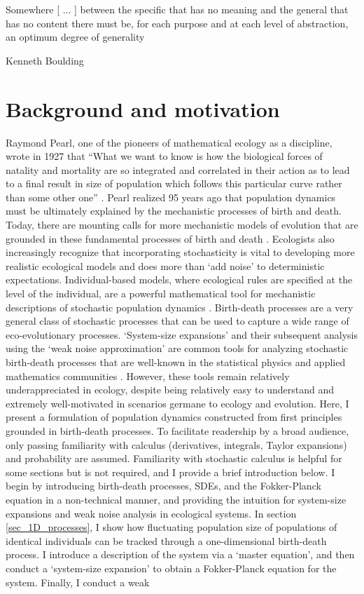 \epigraph{\justifying Somewhere [ ... ] between the specific that has no meaning and the general that has no content there must be, for each purpose and at each level of abstraction, an optimum degree of generality}{Kenneth Boulding}

\section{Background and motivation}

Raymond Pearl, one of the pioneers of mathematical ecology as a discipline, wrote in 1927 that ``What we want to know is how the biological forces of natality and mortality are so integrated and correlated in their action as to lead to a final result in size of population which follows this particular curve rather than some other one'' \citep{pearl_growth_1976}. Pearl realized 95 years ago that population dynamics must be ultimately explained by the mechanistic processes of birth and death. Today, there are mounting calls for more mechanistic models of evolution that are grounded in these fundamental processes of birth and death \citep{geritz_mathematical_2012,doebeli_towards_2017}. Ecologists also increasingly recognize that incorporating stochasticity is vital to developing more realistic ecological models \citep{hastings_transients_2004, coulson_skeletons_2004, boettiger_noise_2018, shoemaker_integrating_2020,schreiber_does_2022} and does more than `add noise' to deterministic expectations. Individual-based models, where ecological rules are specified at the level of the individual, are a powerful mathematical tool for mechanistic descriptions of stochastic population dynamics \citep{black_stochastic_2012}. Birth-death processes are a very general class of stochastic processes that can be used to capture a wide range of eco-evolutionary processes. `System-size expansions' and their subsequent analysis using the `weak noise approximation' are common tools for analyzing stochastic birth-death processes that are well-known in the statistical physics and applied mathematics communities \citep{gardiner_stochastic_2009}. However, these tools remain relatively underappreciated in ecology, despite being relatively easy to understand and extremely well-motivated in scenarios germane to ecology and evolution. Here, I present a formulation of population dynamics constructed from first principles grounded in birth-death processes. To facilitate readership by a broad audience, only passing familiarity with calculus (derivatives, integrals, Taylor expansions) and probability are assumed. Familiarity with stochastic calculus is helpful for some sections but is not required, and I provide a brief introduction below. I begin by introducing birth-death processes, SDEs, and the Fokker-Planck equation in a non-technical manner, and providing the intuition for system-size expansions and weak noise analysis in ecological systems. In section \ref{sec_1D_processes}, I show how fluctuating population size of populations of identical individuals can be tracked through a one-dimensional birth-death process. I introduce a description of the system via a `master equation', and then conduct a `system-size expansion' to obtain a Fokker-Planck equation for the system. Finally, I conduct a weak 